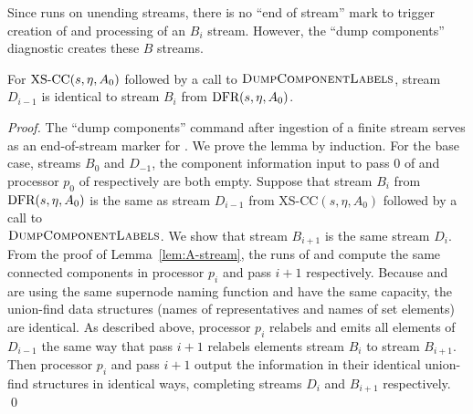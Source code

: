 Since \XSCC runs on unending streams, there is no ``end of stream'' mark to trigger creation of and processing of an \DFR $B_i$ stream.  However, the ``dump components'' diagnostic creates these $B$ streams.

\begin{lemma}
For $\mbox{XS-CC}(s,\eta,A_0)$ followed by a call
to $\Call{DumpComponentLabels}{}$, stream $D_{i-1}$ is identical to
stream $B_i$ from $\mbox{DFR}(s,\eta,A_0)$.
\label{lemma:B-stream}
\end{lemma}
\begin{proof}
The ``dump components'' command after ingestion of a finite stream serves as an end-of-stream marker for \XSCC. We prove the lemma by induction. For the base case, streams $B_0$ and $D_{-1}$, the component information input to pass $0$ of \DFR and processor $p_0$ of \XSCC respectively are both empty. Suppose that stream $B_i$ from $\mbox{DFR}(s,\eta,A_0)$ is the same as stream $D_{i-1}$ from 
XS-CC$(s,\eta,A_0)$ followed
by a call to\\ $\Call{DumpComponentLabels}{}$. We show that stream $B_{i+1}$ is the same stream $D_i$. From the proof of Lemma~\ref{lem:A-stream}, the runs of \XSCC and \DFR compute the same connected components in processor $p_i$ and pass $i+1$ respectively. Because \XSCC and \DFR are using the same supernode naming function and have the same capacity, the union-find data structures (names of representatives and names of set elements) are identical. As described above, processor $p_{i}$ relabels and emits all elements of $D_{i-1}$ the same way that \DFR pass $i+1$ relabels elements stream $B_i$ to stream $B_{i+1}$. Then processor $p_i$ and \DFR pass $i+1$ output the information in their identical union-find structures in identical ways, completing streams $D_i$ and $B_{i+1}$ respectively. \qed
\end{proof}

